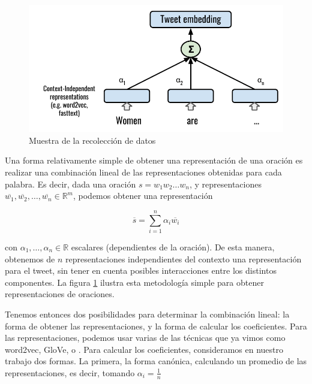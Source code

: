 
\begin{figure}[t]
    \centering
    \includegraphics[width=\textwidth]{img/tweet_embeddings.pdf}
    \caption{Muestra de la recolección de datos}
    \label{fig:tweet_embeddings}
\end{figure}

Una forma relativamente simple de obtener una representación de una oración es realizar una combinación lineal de las representaciones obtenidas para cada palabra. Es decir, dada una oración $s = w_1 w_2 \ldots w_n$, y representaciones $\overline{w_1}, \overline{w_2}, \ldots, \overline{w_n} \in \mathbb{R}^m$, podemos obtener una representación

\begin{equation}
    \overline{s} = \sum\limits_{i=1}^{n} \alpha_i \overline{w_i}
\end{equation}

con $\alpha_1, \ldots, \alpha_n \in \mathbb{R}$ escalares (dependientes de la oración). De esta manera, obtenemos de $n$ representaciones independientes del contexto una representación para el tweet, sin tener en cuenta posibles interacciones entre los distintos componentes. La figura \ref{fig:tweet_embeddings} ilustra esta metodología simple para obtener representaciones de oraciones.

Tenemos entonces dos posibilidades para determinar la combinación lineal: la forma de obtener las representaciones, y la forma de calcular los coeficientes. Para las representaciones, podemos usar varias de las técnicas que ya vimos como word2vec, GloVe, o \fasttext{}. Para calcular los coeficientes, consideramos en nuestro trabajo dos formas. La primera, la forma canónica, calculando un promedio de las representaciones, es decir, tomando $\alpha_i = \frac{1}{n}$

